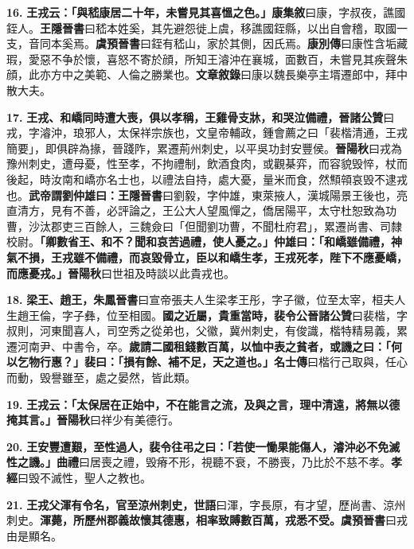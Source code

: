 \textbf{16.} \textbf{王戎云：「與嵇康居二十年，未嘗見其喜慍之色。」}{\footnotesize \textbf{康集敘}曰康，字叔夜，譙國銍人。\textbf{王隱晉書}曰嵇本姓奚，其先避怨徙上虞，移譙國銍縣，以出自會稽，取國一支，音同本奚焉。\textbf{虞預晉書}曰銍有嵇山，家於其側，因氏焉。\textbf{康別傳}曰康性含垢藏瑕，愛惡不争於懷，喜怒不寄於顔，所知王濬沖在襄城，面數百，未嘗見其疾聲朱顔，此亦方中之美範、人倫之勝業也。\textbf{文章敘錄}曰康以魏長樂亭主壻遷郎中，拜中散大夫。}

\textbf{17.} \textbf{王戎、和嶠同時遭大喪，俱以孝稱，王雞骨支牀，和哭泣備禮，}{\footnotesize \textbf{晉諸公贊}曰戎，字濬沖，琅邪人，太保祥宗族也，文皇帝輔政，鍾會薦之曰「裴楷清通，王戎簡要」，即俱辟為掾，晉踐阼，累遷荊州刺史，以平吳功封安豐侯。\textbf{晉陽秋}曰戎為豫州刺史，遭母憂，性至孝，不拘禮制，飲酒食肉，或觀棊弈，而容貌毁悴，杖而後起，時汝南和嶠亦名士也，以禮法自持，處大憂，量米而食，然顦顇哀毁不逮戎也。}\textbf{武帝謂劉仲雄曰：}{\footnotesize \textbf{王隱晉書}曰劉毅，字仲雄，東萊掖人，漢城陽景王後也，亮直清方，見有不善，必評論之，王公大人望風憚之，僑居陽平，太守杜恕致為功曹，沙汰郡吏三百餘人，三魏僉曰「但聞劉功曹，不聞杜府君」，累遷尚書、司隸校尉。}\textbf{「卿數省王、和不？聞和哀苦過禮，使人憂之。」仲雄曰：「和嶠雖備禮，神氣不損，王戎雖不備禮，而哀毀骨立，臣以和嶠生孝，王戎死孝，陛下不應憂嶠，而應憂戎。」}{\footnotesize \textbf{晉陽秋}曰世祖及時談以此貴戎也。}

\textbf{18.} \textbf{梁王、趙王，}{\footnotesize \textbf{朱鳳晉書}曰宣帝張夫人生梁孝王彤，字子徽，位至太宰，桓夫人生趙王倫，字子彝，位至相國。}\textbf{國之近屬，貴重當時，裴令公}{\footnotesize \textbf{晉諸公贊}曰裴楷，字叔則，河東聞喜人，司空秀之從弟也，父徽，冀州刺史，有俊識，楷特精易義，累遷河南尹、中書令，卒。}\textbf{歲請二國租錢數百萬，以恤中表之貧者，或譏之曰：「何以乞物行惠？」裴曰：「損有餘、補不足，天之道也。」}{\footnotesize \textbf{名士傳}曰楷行己取與，任心而動，毁譽雖至，處之晏然，皆此類。}

\textbf{19.} \textbf{王戎云：「太保居在正始中，不在能言之流，及與之言，理中清遠，將無以德掩其言。」}{\footnotesize \textbf{晉陽秋}曰祥少有美德行。}

\textbf{20.} \textbf{王安豐遭艱，至性過人，裴令往弔之曰：「若使一慟果能傷人，濬沖必不免滅性之譏。」}{\footnotesize \textbf{曲禮}曰居喪之禮，毁瘠不形，視聽不衰，不勝喪，乃比於不慈不孝。\textbf{孝經}曰毁不滅性，聖人之教也。}

\textbf{21.} \textbf{王戎父渾有令名，官至涼州刺史，}{\footnotesize \textbf{世語}曰渾，字長原，有才望，歷尚書、涼州刺史。}\textbf{渾薨，所歷州郡義故懷其德惠，相率致賻數百萬，戎悉不受。}{\footnotesize \textbf{虞預晉書}曰戎由是顯名。}

